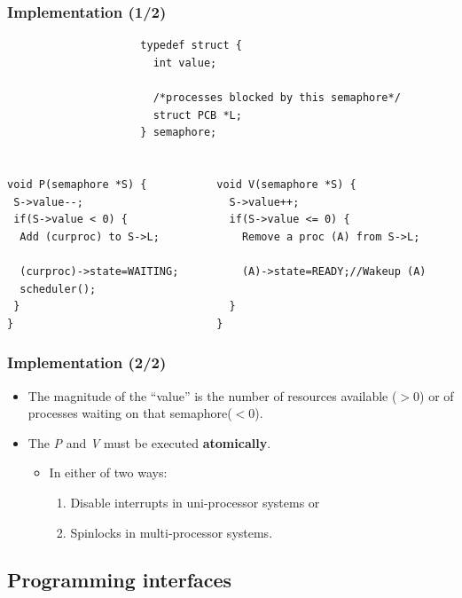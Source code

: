 \documentclass[CJKutf8,xcolor=pdftex,dvipsnames,table]{beamer}
\begin{document}
\begin{CJK*}{UTF8}{song}
  \begin{frame}[fragile]
  \frametitle{Implementation (1/2)} \pause

\begin{lstlisting}
                     typedef struct {
                       int value;

                       /*processes blocked by this semaphore*/
                       struct PCB *L;
                     } semaphore;


void P(semaphore *S) {           void V(semaphore *S) {
 S->value--;                       S->value++;
 if(S->value < 0) {                if(S->value <= 0) {
  Add (curproc) to S->L;             Remove a proc (A) from S->L;

  (curproc)->state=WAITING;          (A)->state=READY;//Wakeup (A)
  scheduler();
 }                                 }
}                                }
\end{lstlisting}

\end{frame}

  \begin{frame}
  \frametitle{Implementation (2/2)} \pause
    \begin{itemize}
    \item{The magnitude of the ``value'' is the number of resources available ($>$0) or of processes waiting on that semaphore($<$0).} \pause
    \item{The \emph{P} and \emph{V} must be executed \textbf{atomically}.} \pause
      \begin{itemize}
      \item{In either of two ways:} \pause
        \begin{enumerate}
        \item{Disable interrupts in uni-processor systems or} \pause
        \item{Spinlocks in multi-processor systems.}
        \end{enumerate}
      \end{itemize}
    \end{itemize}
  \end{frame}

\subsection{Programming interfaces}


\end{CJK*}
\end{document}
